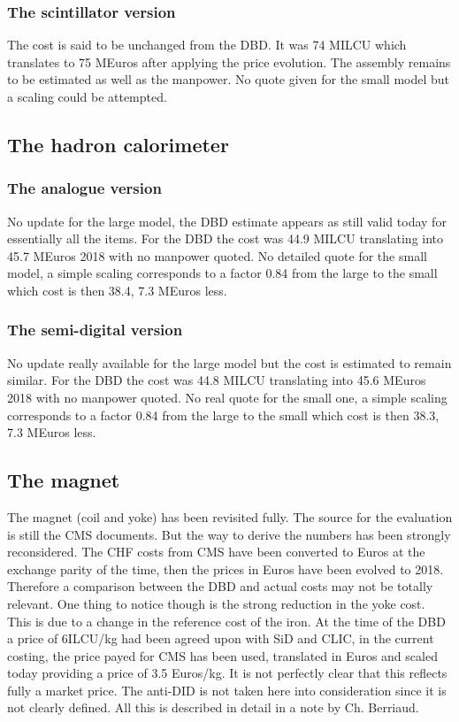 \subsubsection{The scintillator version}
The cost is said to be unchanged from the DBD. It was 74 MILCU which translates to 75 MEuros after applying the price evolution. The assembly remains to be estimated as well as the manpower. No quote given for the small model but a scaling could be attempted.

\subsection{The hadron calorimeter}
\subsubsection{The analogue version}
No update for the large model, the DBD estimate appears as still valid today for essentially all the items. For the DBD the cost was 44.9 MILCU translating into 45.7 MEuros 2018 with no manpower quoted.
No detailed quote for the small model, a simple scaling corresponds to a factor 0.84 from the large to the small which cost is then 38.4, 7.3 MEuros less.

\subsubsection{The semi-digital version }
No update really available for the large model but the cost is estimated to remain similar. For the DBD the cost was 44.8 MILCU translating into 45.6 MEuros 2018 with no manpower quoted.
No real quote for the small one, a simple scaling corresponds to a factor 0.84 from the large to the small which cost is then 38.3, 7.3 MEuros less.

\subsection{The magnet}
The magnet (coil and yoke) has been revisited fully. The source for the evaluation is still the CMS documents. But the way to derive the numbers has been strongly reconsidered. The CHF costs from CMS have been converted to Euros at the exchange parity of the time, then the prices in Euros have been evolved to 2018. Therefore a comparison between the DBD and actual costs may not be totally relevant. One thing to notice though is the  strong reduction in the yoke cost. This  is due to a change in the reference cost of the iron. At the time of the DBD a price of 6ILCU/kg had been agreed upon with SiD and CLIC, in the current costing, the price payed for CMS has been used, translated in Euros and scaled today providing a price of 3.5 Euros/kg. It is not perfectly clear that this reflects fully a market price. The anti-DID is not taken here into consideration since it is not clearly defined. All this is described in detail in a note by Ch. Berriaud.

